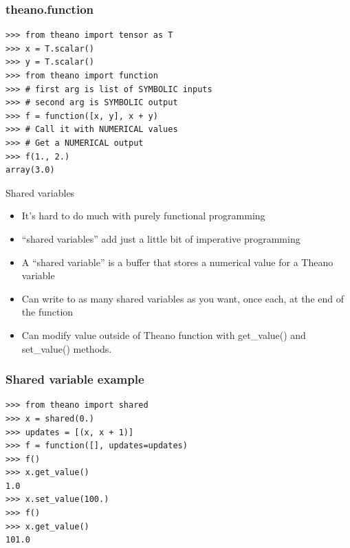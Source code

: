 \documentclass[utf8x,xcolor=pdftex,dvipsnames,table]{beamer}
\begin{document}
\begin{frame}[fragile]
  \frametitle{theano.function}

\begin{lstlisting}
>>> from theano import tensor as T
>>> x = T.scalar()
>>> y = T.scalar()
>>> from theano import function
>>> # first arg is list of SYMBOLIC inputs
>>> # second arg is SYMBOLIC output
>>> f = function([x, y], x + y)
>>> # Call it with NUMERICAL values
>>> # Get a NUMERICAL output
>>> f(1., 2.)
array(3.0)
\end{lstlisting}
\end{frame}

\begin{frame}{Shared variables}
  \begin{itemize}
  \item It’s hard to do much with purely functional programming
  \item ``shared variables'' add just a little bit of imperative programming
  \item A ``shared variable'' is a buffer that stores a numerical value for a Theano variable
  \item Can write to as many shared variables as you want, once each, at the end of the function
  \item Can modify value outside of Theano function with get\_value() and set\_value() methods.
  \end{itemize}
\end{frame}

\begin{frame}[fragile]
  \frametitle{Shared variable example}

\begin{lstlisting}
>>> from theano import shared
>>> x = shared(0.)
>>> updates = [(x, x + 1)]
>>> f = function([], updates=updates)
>>> f()
>>> x.get_value()
1.0
>>> x.set_value(100.)
>>> f()
>>> x.get_value()
101.0
\end{lstlisting}
\end{frame}
\end{document}
